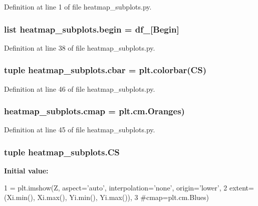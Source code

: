 Definition at line 1 of file heatmap\+\_\+subplots.\+py.

\hypertarget{namespaceheatmap__subplots_adf6fc02d1af5885087dea1400cdcc546}{}
\subsubsection[{begin}]{\setlength{\rightskip}{0pt plus 5cm}list heatmap\+\_\+subplots.\+begin = {\bf df\+\_}\mbox{[}\textquotesingle{}Begin\textquotesingle{}\mbox{]}}\label{namespaceheatmap__subplots_adf6fc02d1af5885087dea1400cdcc546}


Definition at line 38 of file heatmap\+\_\+subplots.\+py.

\hypertarget{namespaceheatmap__subplots_a737acb8a319fcdea231ba28a1fde0f07}{}
\subsubsection[{cbar}]{\setlength{\rightskip}{0pt plus 5cm}tuple heatmap\+\_\+subplots.\+cbar = plt.\+colorbar({\bf C\+S})}\label{namespaceheatmap__subplots_a737acb8a319fcdea231ba28a1fde0f07}


Definition at line 46 of file heatmap\+\_\+subplots.\+py.

\hypertarget{namespaceheatmap__subplots_a65159fa9d4b96b5413a4469f96972503}{}
\subsubsection[{cmap}]{\setlength{\rightskip}{0pt plus 5cm}heatmap\+\_\+subplots.\+cmap = plt.\+cm.\+Oranges)}\label{namespaceheatmap__subplots_a65159fa9d4b96b5413a4469f96972503}


Definition at line 45 of file heatmap\+\_\+subplots.\+py.

\hypertarget{namespaceheatmap__subplots_a7c42f3ab7941ef3754f98b938080fbd4}{}
\subsubsection[{C\+S}]{\setlength{\rightskip}{0pt plus 5cm}tuple heatmap\+\_\+subplots.\+C\+S}\label{namespaceheatmap__subplots_a7c42f3ab7941ef3754f98b938080fbd4}
{\bfseries Initial value\+:}
\begin{DoxyCode}
1 = plt.imshow(Z, aspect=\textcolor{stringliteral}{'auto'}, interpolation=\textcolor{stringliteral}{'none'}, origin=\textcolor{stringliteral}{'lower'},
2                     extent=(Xi.min(), Xi.max(), Yi.min(), Yi.max()),
3                     \textcolor{comment}{#cmap=plt.cm.Blues)}
\end{DoxyCode}


